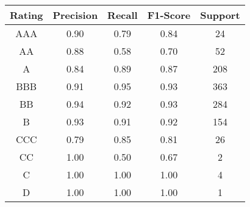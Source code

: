 \footnotesize
\begin{tabular}{ccccc}
\toprule
Rating & Precision & Recall & F1-Score & Support \\
\midrule
AAA & 0.90 & 0.79 & 0.84 & 24 \\
AA & 0.88 & 0.58 & 0.70 & 52 \\
A & 0.84 & 0.89 & 0.87 & 208 \\
BBB & 0.91 & 0.95 & 0.93 & 363 \\
BB & 0.94 & 0.92 & 0.93 & 284 \\
B & 0.93 & 0.91 & 0.92 & 154 \\
CCC & 0.79 & 0.85 & 0.81 & 26 \\
CC & 1.00 & 0.50 & 0.67 & 2 \\
C & 1.00 & 1.00 & 1.00 & 4 \\
D & 1.00 & 1.00 & 1.00 & 1 \\
\bottomrule
\end{tabular}

\normalsize